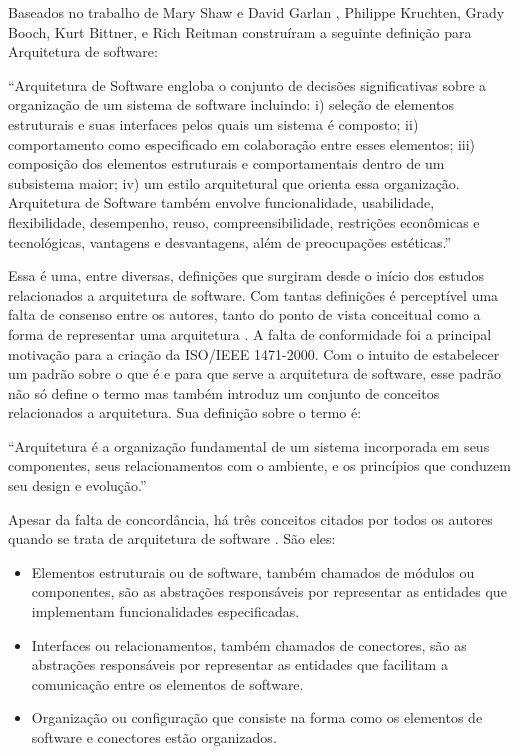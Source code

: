Baseados no trabalho de Mary Shaw e David Garlan \cite{shaw1996software}, Philippe Kruchten, Grady Booch, Kurt Bittner, e Rich Reitman construíram a seguinte definição para Arquitetura de software:

 “Arquitetura de Software engloba o conjunto de decisões significativas sobre a organização de um sistema de software incluindo: i) seleção de elementos estruturais e suas interfaces pelos quais um sistema é composto; ii) comportamento como especificado em colaboração entre esses elementos; iii) composição dos elementos estruturais e comportamentais dentro de um subsistema maior; iv) um estilo arquitetural que orienta essa organização. Arquitetura de Software também envolve funcionalidade, usabilidade, flexibilidade, desempenho, reuso, compreensibilidade, restrições econômicas e tecnológicas, vantagens e desvantagens, além de preocupações estéticas.”

Essa é uma, entre diversas, definições que surgiram desde o início dos estudos relacionados a arquitetura de software. Com tantas definições é perceptível uma falta de consenso entre os autores, tanto do ponto de vista conceitual como a forma de representar uma arquitetura \cite{buschmann2007pattern}.  A falta de conformidade foi a principal motivação para a criação da ISO/IEEE 1471-2000. Com o intuito de estabelecer um padrão sobre o que é e para que serve a arquitetura de software, esse padrão não só define o termo mas também introduz um conjunto de conceitos relacionados a arquitetura. Sua definição sobre o termo é: 

“Arquitetura é a organização fundamental de um sistema incorporada em seus componentes, seus relacionamentos com o ambiente, e os princípios que conduzem seu design e evolução.”

Apesar da falta de concordância, há três conceitos citados por todos os autores quando se trata de arquitetura de software \cite{dias2000software}. São eles:

\begin{itemize}
\item Elementos estruturais ou de software, também chamados de módulos ou componentes, são as abstrações responsáveis por representar as entidades que implementam funcionalidades especificadas.
\item Interfaces ou relacionamentos, também chamados de conectores, são as abstrações responsáveis por representar as entidades que facilitam a comunicação entre os elementos de software.
\item Organização ou configuração que consiste na forma como os elementos de software e conectores estão organizados.
\end{itemize}

